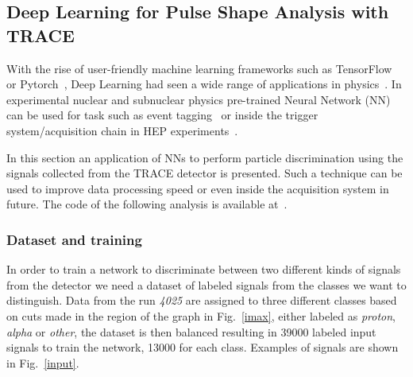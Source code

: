 \subsection{Deep Learning for Pulse Shape Analysis with TRACE}
With the rise of user-friendly machine learning frameworks such as TensorFlow~\cite{tensorflow} or Pytorch~\cite{pytorch}, Deep Learning had seen a wide range of applications in physics~\cite{ml4phys}. In experimental nuclear and subnuclear physics pre-trained Neural Network (NN) can be used for task such as event tagging~\cite{baldi} or inside the trigger system/acquisition chain in HEP experiments~\cite{williams}. 


In this section an application of NNs to perform particle discrimination using the signals collected from the TRACE detector is presented. Such a technique can be used to improve data processing speed or even inside the acquisition system in future.
The code of the following analysis is available at~\cite{github-nn}.

\subsubsection{Dataset and training}

In order to train a network to discriminate between two different kinds of signals from the detector we need a dataset of labeled signals from the classes we want to distinguish. Data from the run \emph{4025} are assigned to three different classes based on cuts made in the region of the graph in Fig.~\ref{imax}, either labeled as \emph{proton}, \emph{alpha} or \emph{other}, the dataset is then balanced resulting in \num{39000} labeled input signals to train the network, \num{13000} for each class. Examples of signals are shown in Fig.~\ref{input}.

